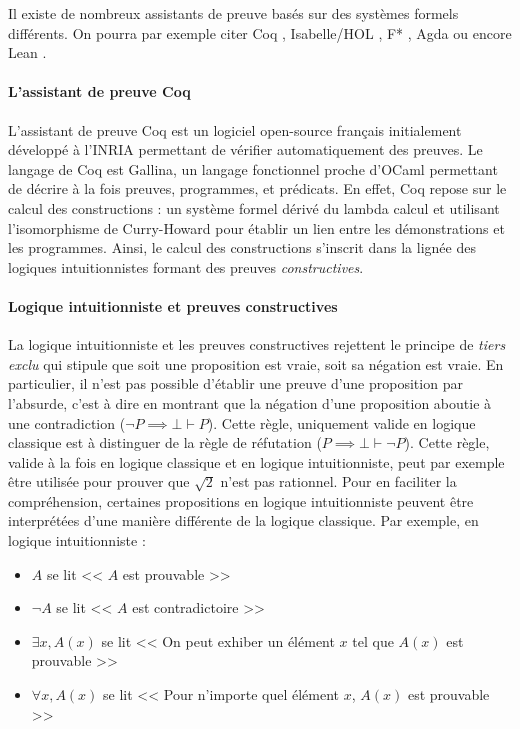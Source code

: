 			Il existe de nombreux assistants de preuve basés sur des systèmes formels différents. On pourra par exemple citer Coq \cite{coq}, Isabelle/HOL \cite{isabellehol}, F* \cite{fstar}, Agda \cite{agda} ou encore Lean \cite{lean}.

			\paragraph{L'assistant de preuve Coq} L'assistant de preuve Coq \cite{coq} est un logiciel open-source français initialement développé à l'INRIA permettant de vérifier automatiquement des preuves. Le langage de Coq est Gallina, un langage fonctionnel proche d'OCaml permettant de décrire à la fois preuves, programmes, et prédicats. En effet, Coq repose sur le calcul des constructions : un système formel dérivé du lambda calcul et utilisant l'isomorphisme de Curry-Howard \cite{isomorphismhoward, isomorphismcurryfeys, isomorphismcurry} pour établir un lien entre les démonstrations et les programmes. Ainsi, le calcul des constructions s'inscrit dans la lignée des logiques intuitionnistes formant des preuves \emph{constructives}. 

			\paragraph{Logique intuitionniste et preuves constructives} La logique intuitionniste et les preuves constructives rejettent le principe de \emph{tiers exclu} qui stipule que soit une proposition est vraie, soit sa négation est vraie. En particulier, il n'est pas possible d'établir une preuve d'une proposition par l'absurde, c'est à dire en montrant que la négation d'une proposition aboutie à une contradiction ($ \neg P \implies \bot \vdash P$). Cette règle, uniquement valide en logique classique est à distinguer de la règle de réfutation ($P \implies \bot \vdash \neg P$). Cette règle, valide à la fois en logique classique et en logique intuitionniste, peut par exemple être utilisée pour prouver que $\sqrt{2}$ n'est pas rationnel.
			Pour en faciliter la compréhension, certaines propositions en logique intuitionniste peuvent être interprétées d'une manière différente de la logique classique. Par exemple, en logique intuitionniste :
			\begin{itemize}
				\item{$A$ se lit << $A$ est prouvable >>}
				\item{$\neg A$ se lit << $A$ est contradictoire >>}
				\item{$\exists x, A(x)$ se lit << On peut exhiber un élément $x$ tel que $A(x)$ est prouvable >>}
				\item{$\forall x, A(x)$ se lit << Pour n'importe quel élément $x$, $A(x)$ est prouvable >>}
			\end{itemize}



